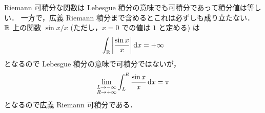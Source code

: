 \begin{example}
    Riemann 可積分な関数は Lebesgue 積分の意味でも可積分であって積分値は等しい．
    一方で，広義 Riemann 積分まで含めるとこれは必ずしも成り立たない．
    $\mathbb{R}$ 上の関数 $\sin x/x$ (ただし，$x=0$ での値は $1$ と定める) は
    \begin{align*}
        \int_{\mathbb{R}}\left\lvert\frac{\sin x}{x}\right\rvert\mathrm{d} x=+\infty
    \end{align*}
    となるので Lebesgue 積分の意味で可積分ではないが，
    \begin{align*}
        \lim_{\substack{L\to-\infty\\R\to+\infty}}\int_{L}^R\frac{\sin x}{x}\,\mathrm{d} x=\pi
    \end{align*}
    となるので広義 Riemann 可積分である．
\end{example}
